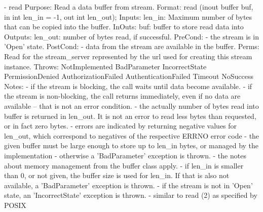 \begin{myspec}
    - read
      Purpose:  Read a data buffer from stream.
      Format:   read                 (inout buffer      buf,
                                      in    int         len_in = -1,
                                      out   int         len_out);
      Inputs:   len_in:               Maximum number of bytes
                                      that can be copied into
                                      the buffer.
      InOuts:   buf:                  buffer to store read data 
                                      into
      Outputs:  len_out:              number of bytes read, if
                                      successful. 
      PreCond:  - the stream is in 'Open' state.
      PostCond: - data from the stream are available in the
                  buffer.
      Perms:    Read for the stream_server represented by the
                url used for creating this stream instance.
      Throws:   NotImplemented
                BadParameter
                IncorrectState
                PermissionDenied
                AuthorizationFailed
                AuthenticationFailed
                Timeout
                NoSuccess
      Notes:    - if the stream is blocking, the call waits
                  until data become available.
                - if the stream is non-blocking, the call
                  returns immediately, even if no data are
                  available -- that is not an error condition.
                - the actually number of bytes read into buffer
                  is returned in len_out.  It is not an error
                  to read less bytes than requested, or in fact
                  zero bytes.
                - errors are indicated by returning negative
                  values for len_out, which correspond to
                  negatives of the respective ERRNO error code
                - the given buffer must be large enough to
                  store up to len_in bytes, or managed by the
                  implementation - otherwise a 'BadParameter'
                  exception is thrown.
                - the notes about memory management from the
                  buffer class apply.
                - if len_in is smaller than 0, or not given, 
                  the buffer size is used for len_in.
                  If that is also not available, a
                  'BadParameter' exception is thrown.
                - if the stream is not in 'Open' state, an
                  'IncorrectState' exception is thrown.
                - similar to read (2) as specified by POSIX
 

\end{myspec}

